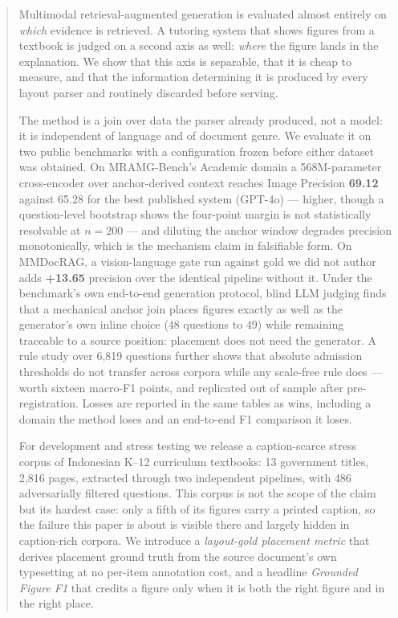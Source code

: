 \documentclass[journal]{IEEEtran}
\begin{document}
\begin{abstract}
Multimodal retrieval-augmented generation is evaluated almost entirely on
\emph{which} evidence is retrieved. A tutoring system that shows figures from a
textbook is judged on a second axis as well: \emph{where} the figure lands in the
explanation. We show that this axis is separable, that it is cheap to measure, and
that the information determining it is produced by every layout parser and
routinely discarded before serving.

The method is a join over data the parser already produced, not a model: it is
independent of language and of document genre. We evaluate it on two public
benchmarks with a configuration frozen before either dataset was obtained. On
MRAMG-Bench's Academic domain a 568M-parameter cross-encoder over
anchor-derived context reaches Image Precision \textbf{69.12} against 65.28 for
the best published system (GPT-4o) --- higher, though a question-level
bootstrap shows the four-point margin is not statistically resolvable at
$n=200$ --- and diluting the anchor window degrades precision monotonically,
which is the mechanism claim in falsifiable form. On MMDocRAG, a
vision-language gate run against gold we did not author adds \textbf{+13.65}
precision over the identical pipeline without it. Under the benchmark's own
end-to-end generation protocol, blind LLM judging finds that a mechanical
anchor join places figures exactly as well as the generator's own inline
choice (48 questions to 49) while remaining traceable to a source position:
placement does not need the generator. A rule study over 6{,}819 questions
further shows that absolute admission thresholds do not transfer across
corpora while any scale-free rule does --- worth sixteen macro-F1 points, and
replicated out of sample after pre-registration. Losses are reported in the
same tables as wins, including a domain the method loses and an end-to-end F1
comparison it loses.

For development and stress testing we release a caption-scarce stress corpus of
Indonesian K--12 curriculum textbooks: 13 government titles,
2{,}816 pages, extracted through two independent pipelines, with 486 adversarially
filtered questions. This corpus is not the scope of the claim but its hardest
case: only a fifth of its figures carry a printed caption, so the failure this
paper is about is visible there and largely hidden in caption-rich corpora. We
introduce a \emph{layout-gold placement metric} that derives placement ground
truth from the source document's own typesetting at no per-item annotation cost,
and a headline \emph{Grounded Figure F1} that credits a figure only when it is
both the right figure and in the right place.


\end{abstract}
\end{document}
